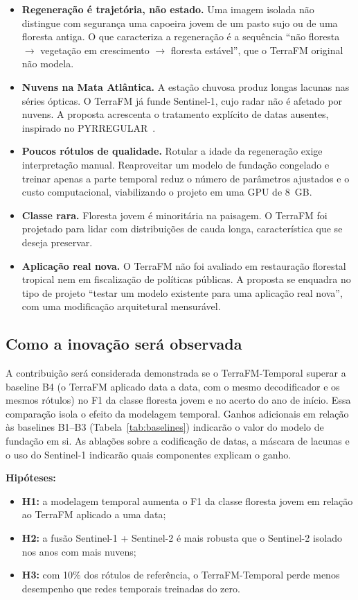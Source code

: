 \documentclass[conference]{IEEEtran}
\begin{document}
\begin{itemize}
\item \textbf{Regeneração é trajetória, não estado.} Uma imagem isolada não distingue com segurança uma capoeira jovem de um pasto sujo ou de uma floresta antiga. O que caracteriza a regeneração é a sequência ``não floresta $\rightarrow$ vegetação em crescimento $\rightarrow$ floresta estável'', que o TerraFM original não modela.
\item \textbf{Nuvens na Mata Atlântica.} A estação chuvosa produz longas lacunas nas séries ópticas. O TerraFM já funde Sentinel-1, cujo radar não é afetado por nuvens. A proposta acrescenta o tratamento explícito de datas ausentes, inspirado no PYRREGULAR~\citep{spinnato2026pyrregular}.
\item \textbf{Poucos rótulos de qualidade.} Rotular a idade da regeneração exige interpretação manual. Reaproveitar um modelo de fundação congelado e treinar apenas a parte temporal reduz o número de parâmetros ajustados e o custo computacional, viabilizando o projeto em uma GPU de 8~GB.
\item \textbf{Classe rara.} Floresta jovem é minoritária na paisagem. O TerraFM foi projetado para lidar com distribuições de cauda longa, característica que se deseja preservar.
\item \textbf{Aplicação real nova.} O TerraFM não foi avaliado em restauração florestal tropical nem em fiscalização de políticas públicas. A proposta se enquadra no tipo de projeto ``testar um modelo existente para uma aplicação real nova'', com uma modificação arquitetural mensurável.
\end{itemize}

\subsection{Como a inovação será observada}

A contribuição será considerada demonstrada se o TerraFM-Temporal superar a baseline B4 (o TerraFM aplicado data a data, com o mesmo decodificador e os mesmos rótulos) no F1 da classe floresta jovem e no acerto do ano de início. Essa comparação isola o efeito da modelagem temporal. Ganhos adicionais em relação às baselines B1--B3 (Tabela~\ref{tab:baselines}) indicarão o valor do modelo de fundação em si. As ablações sobre a codificação de datas, a máscara de lacunas e o uso do Sentinel-1 indicarão quais componentes explicam o ganho.

\textbf{Hipóteses:}
\begin{itemize}
\item \textbf{H1:} a modelagem temporal aumenta o F1 da classe floresta jovem em relação ao TerraFM aplicado a uma data;
\item \textbf{H2:} a fusão Sentinel-1 + Sentinel-2 é mais robusta que o Sentinel-2 isolado nos anos com mais nuvens;
\item \textbf{H3:} com 10\% dos rótulos de referência, o TerraFM-Temporal perde menos desempenho que redes temporais treinadas do zero.
\end{itemize}
\end{document}
